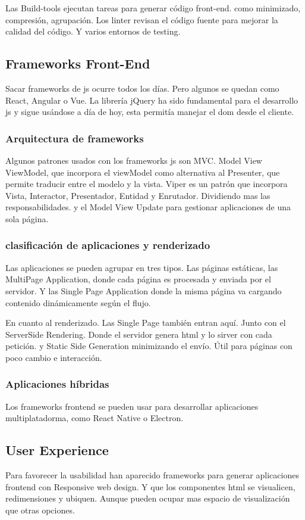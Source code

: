     Las Build-tools ejecutan tareas para generar código front-end. como minimizado, compresión, agrupación. Los linter revisan el código fuente para mejorar la calidad del código. Y varios entornos de testing.

\subsection{Frameworks Front-End}
    Sacar frameworks de js ocurre todos los días. Pero algunos se quedan como React, Angular o Vue. La librería jQuery ha sido fundamental para el desarrollo js y sigue usándose a día de hoy, esta permitía manejar el dom desde el cliente.

\subsubsection{Arquitectura de frameworks}
    Algunos patrones usados con los frameworks js son MVC. Model View ViewModel, que incorpora el viewModel como alternativa al Presenter, que permite traducir entre el modelo y la vista. Viper es un patrón que incorpora Vista, Interactor, Presentador, Entidad y Enrutador. Dividiendo mas las responsabilidades. y el Model View Update para gestionar aplicaciones de una sola página.

    \subsubsection{clasificación de aplicaciones y renderizado}
        Las aplicaciones se pueden agrupar en tres tipos. Las páginas estáticas, las MultiPage Application, donde cada página es procesada y enviada por el servidor. Y las Single Page Application donde la misma página va cargando contenido dinámicamente según el flujo.

        En cuanto al renderizado. Las Single Page también entran aquí. Junto con el ServerSide Rendering. Donde el servidor genera html y lo sirver con cada petición. y Static Side Generation minimizando el envío. Útil para páginas con poco cambio e interacción.

    \subsubsection{Aplicaciones híbridas}
        Los frameworks frontend se pueden usar para desarrollar aplicaciones multiplatadorma, como React Native o Electron.

\subsection{User Experience}
    Para favorecer la usabilidad han aparecido frameworks para generar aplicaciones frontend con Responsive web design. Y que los componentes html se visualicen, redimensiones y ubiquen. Aunque pueden ocupar mas espacio de visualización que otras opciones.

